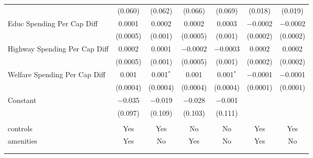 \begin{table}[!htbp]
\begin{tabular}{@{\extracolsep{5pt}}lcccccc}
  & (0.060) & (0.062) & (0.066) & (0.069) & (0.018) & (0.019) \\ 
  Educ Spending Per Cap Diff & 0.0001 & 0.0002 & 0.0002 & 0.0003 & $-$0.0002 & $-$0.0002 \\ 
  & (0.0005) & (0.001) & (0.0005) & (0.001) & (0.0002) & (0.0002) \\ 
  Highway Spending Per Cap Diff & 0.0002 & 0.0001 & $-$0.0002 & $-$0.0003 & 0.0002 & 0.0002 \\ 
  & (0.0005) & (0.001) & (0.0005) & (0.001) & (0.0002) & (0.0002) \\ 
  Welfare Spending Per Cap Diff & 0.001 & 0.001$^{*}$ & 0.001 & 0.001$^{*}$ & $-$0.0001 & $-$0.0001 \\ 
  & (0.0004) & (0.0004) & (0.0004) & (0.0004) & (0.0001) & (0.0001) \\ 
  Constant & $-$0.035 & $-$0.019 & $-$0.028 & $-$0.001 &  &  \\ 
  & (0.097) & (0.109) & (0.103) & (0.111) &  &  \\ 
 \hline \\[-1.8ex] 
controls & Yes & Yes & No & No & Yes & Yes \\ 
amenities & Yes & No & Yes & No & Yes & No \\ 
\hline \\[-1.8ex] 
\hline 
\hline \\[-1.8ex] 
\end{tabular} 
\end{table} 
